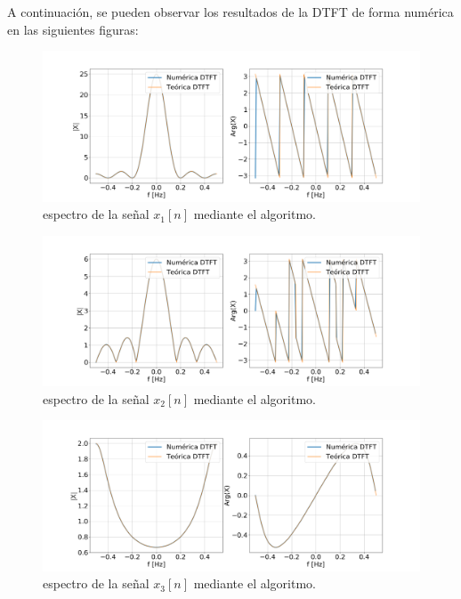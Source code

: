 \documentclass[11pt,a4paper]{article}
\begin{document}
    A continuación, se pueden observar los resultados de la DTFT de forma numérica en las siguientes figuras:
    
    \begin{figure}[H]
    \centering
    \includegraphics[width=\textwidth]{Img/punto_3_e_1.png}
    \caption{espectro de la señal $x_{1}[n]$ mediante el algoritmo.}
    \label{fig.3ei}
    \end{figure} 


    \begin{figure}[H]
    \centering
    \includegraphics[width=\textwidth]{Img/punto_3_e_2.png}
    \caption{espectro de la señal $x_{2}[n]$ mediante el algoritmo.}
    \label{fig.3eii}
    \end{figure}


    \begin{figure}[H]
    \centering
    \includegraphics[width=\textwidth]{Img/punto_3_e_3.png}
    \caption{espectro de la señal $x_{3}[n]$ mediante el algoritmo.}
    \label{fig.3eiii}
    \end{figure}
\end{document}
